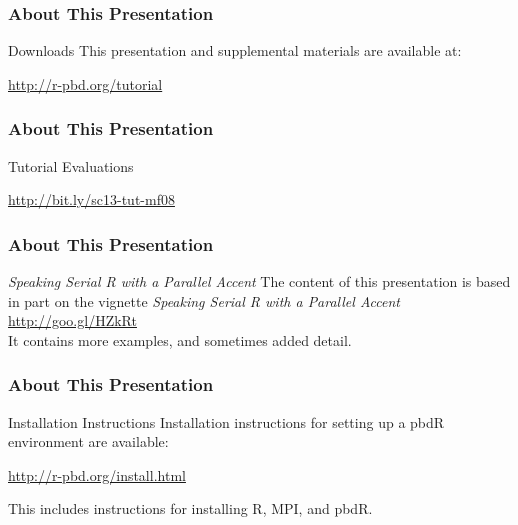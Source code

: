 \begin{frame}
\frametitle{About This Presentation}
 \begin{block}{Downloads}
  This presentation and supplemental materials are available at:
  \begin{center}
  \url{http://r-pbd.org/tutorial}
  \end{center}
 \end{block}
\end{frame}


\begin{frame}
\frametitle{About This Presentation}
  \begin{block}{Tutorial Evaluations}
    \begin{center}
      \url{http://bit.ly/sc13-tut-mf08}
    \end{center}
  \end{block}
\end{frame}


\begin{frame}
\frametitle{About This Presentation}
 \begin{block}{\emph{Speaking Serial R with a Parallel Accent}}
  The content of this presentation is based in part on the  
vignette \emph{Speaking Serial R with a Parallel Accent}\\[.4cm]
  \url{http://goo.gl/HZkRt}\\[.4cm]
  It contains more examples, and sometimes added detail.
 \end{block}
\end{frame}


\begin{frame}
\frametitle{About This Presentation}
 \begin{block}{Installation Instructions}
  Installation instructions for setting up a pbdR environment are available:
  \begin{center}
  \url{http://r-pbd.org/install.html}
  \end{center}
  This includes instructions for installing R, MPI, and pbdR.
 \end{block}
\end{frame}



